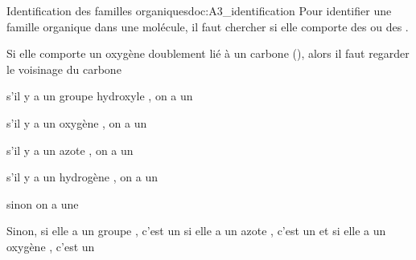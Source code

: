 \begin{doc}{Identification des familles organiques}{doc:A3_identification}
  Pour identifier une famille organique dans une molécule, il faut chercher si elle comporte des  ou des . 
  
  Si elle comporte un oxygène  doublement lié à un carbone (), alors il faut regarder le voisinage du carbone
  \begin{listePoints}
      \item s'il y a un groupe hydroxyle , on a un 
      \item s'il y a un oxygène , on a un 
      \item s'il y a un azote , on a un 
      \item s'il y a un hydrogène , on a un 
      \item sinon on a une 
  \end{listePoints}
  Sinon, si elle a un groupe , c'est un  si elle a un azote , c'est un  et si elle a un oxygène , c'est un 
\end{doc}